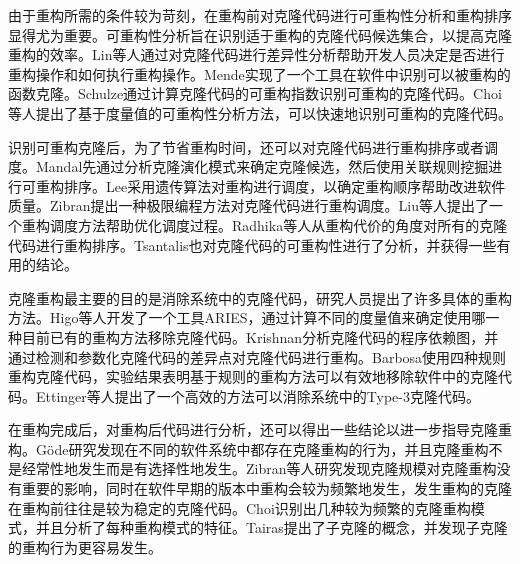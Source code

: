 由于重构所需的条件较为苛刻，在重构前对克隆代码进行可重构性分析和重构排序显得尤为重要。可重构性分析旨在识别适于重构的克隆代码候选集合，以提高克隆重构的效率\cite{lin2014detecting,mende2009evaluation,schulze2008towards,choi2011extracting}。Lin等人通过对克隆代码进行差异性分析帮助开发人员决定是否进行重构操作和如何执行重构操作\cite{lin2014detecting}。Mende实现了一个工具在软件中识别可以被重构的函数克隆\cite{mende2009evaluation}。Schulze通过计算克隆代码的可重构指数识别可重构的克隆代码\cite{schulze2008towards}。Choi等人提出了基于度量值的可重构性分析方法，可以快速地识别可重构的克隆代码\cite{choi2011extracting}。

识别可重构克隆后，为了节省重构时间，还可以对克隆代码进行重构排序或者调度\cite{mandal2014automatic,lee2011automated,zibran2011constraint}。Mandal先通过分析克隆演化模式来确定克隆候选，然后使用关联规则挖掘进行可重构排序\cite{mandal2014automatic}。Lee采用遗传算法对重构进行调度，以确定重构顺序帮助改进软件质量\cite{lee2011automated}。Zibran提出一种极限编程方法对克隆代码进行重构调度\cite{zibran2011constraint}。Liu等人提出了一个重构调度方法帮助优化调度过程\cite{liu2012schedule}。Radhika等人从重构代价的角度对所有的克隆代码进行重构排序\cite{venkatasubramanyam2013prioritizing}。Tsantalis也对克隆代码的可重构性进行了分析，并获得一些有用的结论\cite{tsantalis2015assessing}。

克隆重构最主要的目的是消除系统中的克隆代码，研究人员提出了许多具体的重构方法\cite{higo2008metric,krishnan2014unification,barbosa2013removing,ettinger2017efficient}。Higo等人开发了一个工具ARIES，通过计算不同的度量值来确定使用哪一种目前已有的重构方法移除克隆代码\cite{higo2008metric}。Krishnan分析克隆代码的程序依赖图，并通过检测和参数化克隆代码的差异点对克隆代码进行重构\cite{krishnan2014unification}。Barbosa使用四种规则重构克隆代码，实验结果表明基于规则的重构方法可以有效地移除软件中的克隆代码\cite{barbosa2013removing}。Ettinger等人提出了一个高效的方法可以消除系统中的Type-3克隆代码\cite{ettinger2017efficient}。

在重构完成后，对重构后代码进行分析，还可以得出一些结论以进一步指导克隆重构\cite{gode2010clone,zibran2013evaluating,eunjong2014investigation,eunjong2014investigation}。G{\"o}de研究发现在不同的软件系统中都存在克隆重构的行为，并且克隆重构不是经常性地发生而是有选择性地发生\cite{gode2010clone}。Zibran等人研究发现克隆规模对克隆重构没有重要的影响，同时在软件早期的版本中重构会较为频繁地发生，发生重构的克隆在重构前往往是较为稳定的克隆代码\cite{zibran2013evaluating}。Choi识别出几种较为频繁的克隆重构模式，并且分析了每种重构模式的特征\cite{eunjong2014investigation}。Tairas提出了子克隆的概念，并发现子克隆的重构行为更容易发生\cite{tairas2010sub}。


